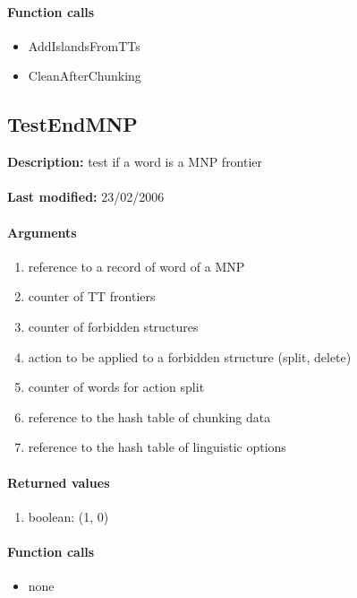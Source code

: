 \paragraph{Function calls}
\begin{itemize}
\item AddIslandsFromTTs
\item CleanAfterChunking
\end{itemize}

\subsection{TestEndMNP}
\textbf{Description:} test if a word is a MNP frontier\\
\\\textbf{Last modified:} 23/02/2006

\paragraph{Arguments}
\begin{enumerate}
\item reference to a record of word of a MNP
\item counter of TT frontiers
\item counter of forbidden structures
\item action to be applied to a forbidden structure (split, delete)
\item counter of words for action split
\item reference to the hash table of chunking data
\item reference to the hash table of linguistic options
\end{enumerate}

\paragraph{Returned values}
\begin{enumerate}
\item boolean: (1, 0)
\end{enumerate}

\paragraph{Function calls}
\begin{itemize}
\item none
\end{itemize}


